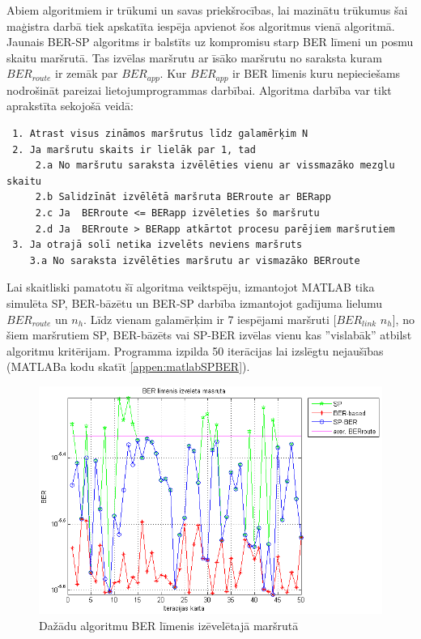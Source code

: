 Abiem algoritmiem ir trūkumi un savas priekšrocības, lai mazinātu trūkumus šai maģistra darbā tiek  apskatīta iespēja apvienot šos algoritmus vienā algoritmā. Jaunais BER-SP algoritms ir balstīts uz kompromisu starp BER līmeni un posmu skaitu maršrutā. Tas izvēlas maršrutu ar īsāko maršrutu no saraksta kuram $BER_{route}$ ir zemāk par $BER_{app}$. Kur $BER_{app}$ ir BER līmenis kuru nepieciešams  nodrošināt pareizai lietojumprogrammas darbībai.  Algoritma darbība var tikt aprakstīta sekojošā veidā:
\begin{center}
 \begin{verbatim}
 1. Atrast visus zināmos maršrutus līdz galamērķim N
 2. Ja maršrutu skaits ir lielāk par 1, tad
     2.a No maršrutu saraksta izvēlēties vienu ar vissmazāko mezglu skaitu
     2.b Salidzīnāt izvēlētā maršruta BERroute ar BERapp
     2.c Ja  BERroute <= BERapp izvēleties šo maršrutu
     2.d Ja  BERroute > BERapp atkārtot procesu parējiem maršrutiem
 3. Ja otrajā solī netika izvelēts neviens maršruts
    3.a No saraksta izvēlēties maršrutu ar vismazāko BERroute
\end{verbatim}
\end{center}
Lai skaitliski pamatotu šī algoritma veiktspēju, izmantojot MATLAB tika simulēta SP, BER-bāzētu un BER-SP darbība izmantojot gadījuma lielumu $BER_{route}$ un $n_{h}$. Līdz vienam galamērķim ir 7 iespējami maršruti [$BER_{link}$ $n_{h}$], no šiem maršrutiem SP, BER-bāzēts vai SP-BER izvēlas vienu kas ''vislabāk'' atbilst algoritmu kritērijam. Programma izpilda 50 iterācijas lai izslēgtu nejaušības (MATLABa kodu skatīt \ref{appen:matlabSPBER}).

\begin{figure}
 \centering
 \includegraphics[scale=0.75]{./graph/BERSP_BER}
\caption{Dažādu algoritmu BER līmenis izēvelētajā maršrutā}
\label{fig:SPBER_ber}
\end{figure}

